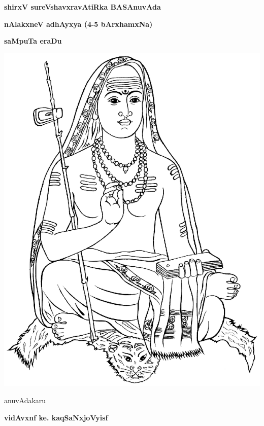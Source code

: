 \thispagestyle{empty}
\begin{center}
{\Huge\bfseries shirxV sureVshavxravAtiRka BASAnuvAda}
\bigskip

{\Large\bfseries nAlakxneV adhAyxya (4-5 bArxhamxNa)}
\bigskip

{\Large\bfseries saMpuTa eraDu}
\vfill

\includegraphics[scale=0.7]{figures/shankaracharya.eps}

\vfill

anuvAdakaru
\smallskip

{\large\bfseries vidAvxnf ke. kaqSaNxjoVyisf}


\end{center}
